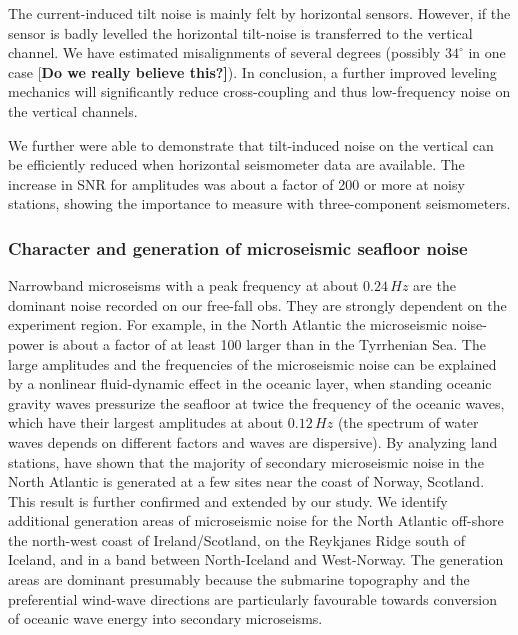 \documentclass{article}
\providecommand{\remark}[1]{{\typeout{REMARK (p.\arabic{page}): #1}[\bf #1]}}
\begin{document}
{The current-induced tilt noise is 
mainly felt by horizontal sensors.
However, if the sensor is badly levelled the horizontal 
tilt-noise is transferred to the vertical channel.
We have estimated misalignments of several degrees (possibly $34^{\circ}$ in 
one case \remark{Do we really believe this?}).
In conclusion, a further improved leveling mechanics 
will significantly reduce cross-coupling and thus low-frequency noise on the
vertical channels.

We further were able to demonstrate that tilt-induced noise on the
vertical  can be 
efficiently reduced when horizontal seismometer data are available.
The increase in SNR for amplitudes was about a factor of 200 or more 
at noisy stations, showing the importance to measure with
three-component seismometers.

\subsubsection*{Character and generation of microseismic seafloor noise}

Narrowband microseisms with a peak frequency at about 
$0.24\, Hz$ are the dominant  noise recorded on our free-fall obs.
They are  strongly dependent on the experiment region.
For example, in 
the North Atlantic the microseismic noise-power
is about a factor of at least 100 larger than in the Tyrrhenian Sea.
The large amplitudes and the frequencies of the 
microseismic noise can be explained by a nonlinear fluid-dynamic 
effect in the oceanic layer, when 
standing oceanic gravity waves pressurize the seafloor    
at twice the frequency of the oceanic waves, which have 
their largest amplitudes at about $0.12\, Hz$
(the spectrum of water waves depends on different factors and waves are
dispersive).
By analyzing land stations, 
\cite{essen:03} have shown that 
the majority of secondary microseismic noise in the North Atlantic 
is generated at a few sites near  the coast of Norway, Scotland.
This result is further confirmed and extended  by our study. 
We identify additional generation areas of microseismic noise 
for the North Atlantic 
off-shore the north-west coast of Ireland/Scotland, 
on the Reykjanes Ridge south of Iceland,
and in a band between North-Iceland and West-Norway.
The generation areas are dominant presumably because 
the submarine topography and the preferential wind-wave directions
are particularly favourable towards conversion of oceanic wave energy 
into secondary microseisms.
  
}
\end{document}
